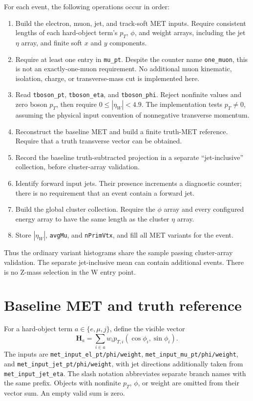\documentclass[11pt,a4paper]{article}
\newcommand{\code}[1]{\texttt{\nolinkurl{#1}}}
\begin{document}
For each event, the following operations occur in order:
\begin{enumerate}
\item Build the electron, muon, jet, and track-soft MET inputs. Require
consistent lengths of each hard-object term's $p_T$, $\phi$, and weight arrays,
including the jet $\eta$ array, and finite soft $x$ and $y$ components.
\item Require at least one entry in \code{mu_pt}. Despite the counter name
\code{one_muon}, this is not an exactly-one-muon requirement. No additional
muon kinematic, isolation, charge, or transverse-mass cut is implemented here.
\item Read \code{tboson_pt}, \code{tboson_eta}, and \code{tboson_phi}.
Reject nonfinite values and zero boson $p_T$, then require
$0\leq |\eta_W|<4.9$. The implementation tests $p_T\ne0$, assuming the physical
input convention of nonnegative transverse momentum.
\item Reconstruct the baseline MET and build a finite truth-MET reference.
Require that a truth transverse vector can be obtained.
\item Record the baseline truth-subtracted projection in a separate
``jet-inclusive'' collection, before cluster-array validation.
\item Identify forward input jets. Their presence increments a diagnostic
counter; there is no requirement that an event contain a forward jet.
\item Build the global cluster collection. Require the $\phi$ array and every
configured energy array to have the same length as the cluster $\eta$ array.
\item Store $|\eta_W|$, \code{avgMu}, and \code{nPrimVtx}, and fill all MET
variants for the event.
\end{enumerate}
Thus the ordinary variant histograms share the sample passing cluster-array
validation. The separate jet-inclusive mean can contain additional events.
There is no Z-mass selection in the W entry point.

\section{Baseline MET and truth reference}
For a hard-object term $a\in\{e,\mu,j\}$, define the visible vector
\begin{equation}
 \boldsymbol{H}_a=\sum_{i\in a}w_i p_{T,i}
       (\cos\phi_i,\sin\phi_i).
\end{equation}
The inputs are \code{met_input_el_pt/phi/weight},
\code{met_input_mu_pt/phi/weight}, and
\code{met_input_jet_pt/phi/weight}, with jet directions additionally taken
from \code{met_input_jet_eta}. The slash notation abbreviates separate branch
names with the same prefix. Objects with nonfinite $p_T$, $\phi$, or weight
are omitted from their vector sum. An empty valid sum is zero.
\end{document}
